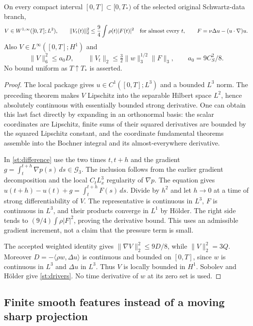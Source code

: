 \begin{theorem}\label{st:time}
On every compact interval $[0,T]\subset[0,T_*)$ of the selected original
Schwartz-data branch,
\[
 V\in W^{1,\infty}([0,T];L^2),\qquad
 \|V_t(t)\|_2^2\le\frac94\int\rho(t)|F(t)|^2
 \quad\hbox{for almost every }t,
 \qquad F=\nu\Delta u-(u\cdot\nabla)u.
\]
Also $V\in L^\infty([0,T];H^1)$ and
\begin{equation}\label{st:drivers}
 \|V\|_6^2\le a_0D,\qquad
 \|V_t\|_2\le\tfrac32\|w\|_3^{1/2}\|F\|_3,
 \qquad a_0=9C_S^2/8.
\end{equation}
No bound uniform as $T\uparrow T_*$ is asserted.
\end{theorem}
\begin{proof}
The local package gives $u\in C^1([0,T];L^3)$ and a bounded $L^3$
norm. The preceding theorem makes $V$ Lipschitz into the separable
Hilbert space $L^2$, hence absolutely continuous with essentially
bounded strong derivative. One can obtain this last fact directly by
expanding in an orthonormal basis: the scalar coordinates are Lipschitz,
finite sums of their squared derivatives are bounded by the squared
Lipschitz constant, and the coordinate fundamental theorems assemble
into the Bochner integral and its almost-everywhere derivative.

In \eqref{st:difference} use the two times $t,t+h$ and the gradient
$g=\int_t^{t+h}\nabla p(s)\,ds\in\mathcal G_3$. The inclusion follows
from the earlier gradient decomposition and the local $C_tL^3_x$
regularity of $\nabla p$. The equation gives
$u(t+h)-u(t)+g=\int_t^{t+h}F(s)\,ds$. Divide by $h^2$ and let
$h\to0$ at a time of strong differentiability of $V$.
The representative is continuous in $L^3$, $F$ is continuous in $L^3$,
and their products converge in $L^1$ by H\"older. The right side tends
to $(9/4)\int\rho|F|^2$, proving the derivative bound.
This uses an admissible gradient increment, not a claim that the
pressure term is small.

The accepted weighted identity gives
$\|\nabla V\|_2^2\le9D/8$, while $\|V\|_2^2=3Q$.
Moreover $D=-\langle\rho w,\Delta u\rangle$ is continuous and bounded
on $[0,T]$, since $w$ is continuous in $L^3$ and $\Delta u$ in $L^3$.
Thus $V$ is locally bounded in $H^1$. Sobolev and H\"older give
\eqref{st:drivers}. No time derivative of $w$ at its zero set is used.
\end{proof}

\subsection{Finite smooth features instead of a moving sharp projection}

